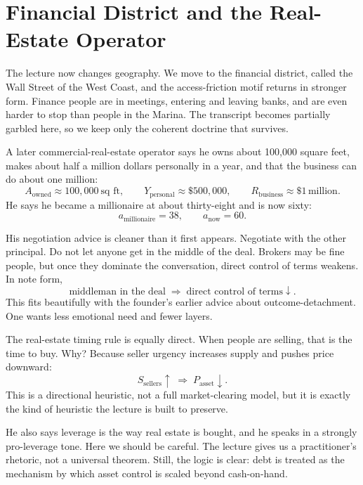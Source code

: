 \section{Financial District and the Real-Estate Operator}

The lecture now changes geography. We move to the financial district, called the Wall Street of the West Coast, and the access-friction motif returns in stronger form. Finance people are in meetings, entering and leaving banks, and are even harder to stop than people in the Marina. The transcript becomes partially garbled here, so we keep only the coherent doctrine that survives.

A later commercial-real-estate operator says he owns about 100,000 square feet, makes about half a million dollars personally in a year, and that the business can do about one million:
\begin{equation}
A_{\text{owned}} \approx 100{,}000\ \text{sq ft},\qquad
Y_{\text{personal}} \approx \$500{,}000,\qquad
R_{\text{business}} \approx \$1\,\text{million}.
\end{equation}
He says he became a millionaire at about thirty-eight and is now sixty:
\begin{equation}
a_{\text{millionaire}}=38,\qquad
a_{\text{now}}=60.
\end{equation}

His negotiation advice is cleaner than it first appears. Negotiate with the other principal. Do not let anyone get in the middle of the deal. Brokers may be fine people, but once they dominate the conversation, direct control of terms weakens. In note form,
\begin{equation}
\text{middleman in the deal} \;\Rightarrow\; \text{direct control of terms}\downarrow.
\end{equation}
This fits beautifully with the founder's earlier advice about outcome-detachment. One wants less emotional need and fewer layers.

The real-estate timing rule is equally direct. When people are selling, that is the time to buy. Why? Because seller urgency increases supply and pushes price downward:
\begin{equation}
S_{\text{sellers}}\uparrow \;\Rightarrow\; P_{\text{asset}}\downarrow.
\end{equation}
This is a directional heuristic, not a full market-clearing model, but it is exactly the kind of heuristic the lecture is built to preserve.

He also says leverage is the way real estate is bought, and he speaks in a strongly pro-leverage tone. Here we should be careful. The lecture gives us a practitioner's rhetoric, not a universal theorem. Still, the logic is clear: debt is treated as the mechanism by which asset control is scaled beyond cash-on-hand.


